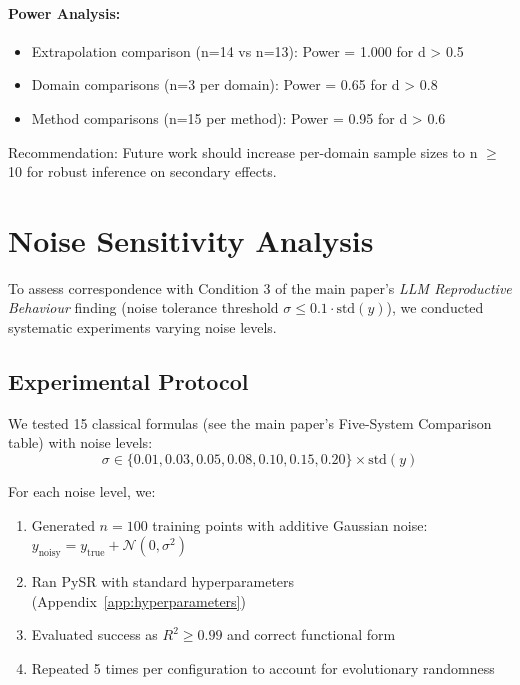 \documentclass[twoside,11pt]{article}
\begin{document}
\paragraph{Power Analysis:}
\begin{itemize}
\item Extrapolation comparison (n=14 vs n=13): Power = 1.000 for d > 0.5
\item Domain comparisons (n=3 per domain): Power = 0.65 for d > 0.8
\item Method comparisons (n=15 per method): Power = 0.95 for d > 0.6
\end{itemize}

Recommendation: Future work should increase per-domain sample sizes to n $\geq$ 10 for robust inference on secondary effects.



\section{Noise Sensitivity Analysis}
\label{app:noise_sensitivity}

To assess correspondence with Condition 3 of the main paper's \emph{LLM Reproductive Behaviour} finding (noise tolerance threshold $\sigma \leq 0.1 \cdot \text{std}(y)$), we conducted systematic experiments varying noise levels.

\subsection{Experimental Protocol}

We tested 15 classical formulas (see the main paper's Five-System Comparison table) with noise levels:
\[
\sigma \in \{0.01, 0.03, 0.05, 0.08, 0.10, 0.15, 0.20\} \times \text{std}(y)
\]

For each noise level, we:
\begin{enumerate}
\item Generated $n = 100$ training points with additive Gaussian noise: $y_{\text{noisy}} = y_{\text{true}} + \mathcal{N}(0, \sigma^2)$
\item Ran PySR with standard hyperparameters (Appendix~\ref{app:hyperparameters})
\item Evaluated success as $R^2 \geq 0.99$ and correct functional form
\item Repeated 5 times per configuration to account for evolutionary randomness
\end{enumerate}
\end{document}
